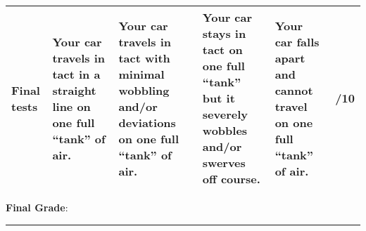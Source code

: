 \documentclass{article}
\begin{document}
\begin{center}
\begin{tabular}{|p{2cm}|p{5cm}|p{5cm}|p{5cm}|p{3cm}|p{1.5cm}|}
        Final tests & Your car travels in tact in a straight line on one full ``tank'' of air. & Your car travels in tact with minimal wobbling and/or deviations on one full ``tank'' of air. & Your car stays in tact on one full ``tank'' but it severely wobbles and/or swerves off course. & Your car falls apart and cannot travel on one full ``tank'' of air. & \hspace{2em} \textbf{/10}\\
        \hline
    \hline
    \end{tabular}
\end{center}
\vspace{1em}

{\Large \textbf{Final Grade}:} \rule{2cm}{0.15mm}
\end{document}

